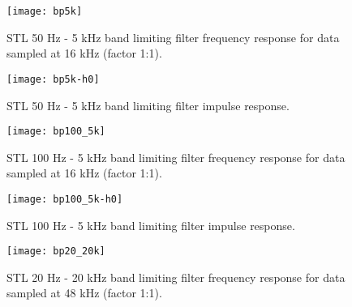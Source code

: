\clearpage
\newpage


\begin{figure}[hbtp]
  \begin{center}
 \texttt{[image: bp5k]}

  \end{center}
  \caption{\SF STL 50 Hz - 5 kHz band limiting filter frequency response for data
               sampled at 16 kHz (factor 1:1).
           \label{bp5k-16k-frq}
          }
\end{figure}


\begin{figure}[h!btp]
  \begin{center}
 \texttt{[image: bp5k-h0]}
  \end{center}
  \caption{\SF STL 50 Hz - 5 kHz band limiting filter impulse response.
           \label{bp5k-16k-ir}
          }
\end{figure}


\begin{figure}[hbtp]
  \begin{center}
 \texttt{[image: bp100\_5k]}
  \end{center}
  \caption{\SF STL 100 Hz - 5 kHz band limiting filter frequency response for data
               sampled at 16 kHz (factor 1:1).
           \label{bp100_5k-16k-frq}
          }
\end{figure}


\begin{figure}[hbtp]
  \begin{center}
 \texttt{[image: bp100\_5k-h0]}
  \end{center}
  \caption{\SF STL 100 Hz - 5 kHz band limiting filter impulse response.
           \label{bp100_5k-16k-ir}
          }
\end{figure}


\begin{figure}[h]
  \begin{center}
\texttt{[image: bp20\_20k]}
  \end{center}
  \caption{\SF STL 20 Hz - 20 kHz band limiting filter frequency response for data
               sampled at 48 kHz (factor 1:1).
           \label{bp20_20k-48k-frq}
          }
\end{figure}


